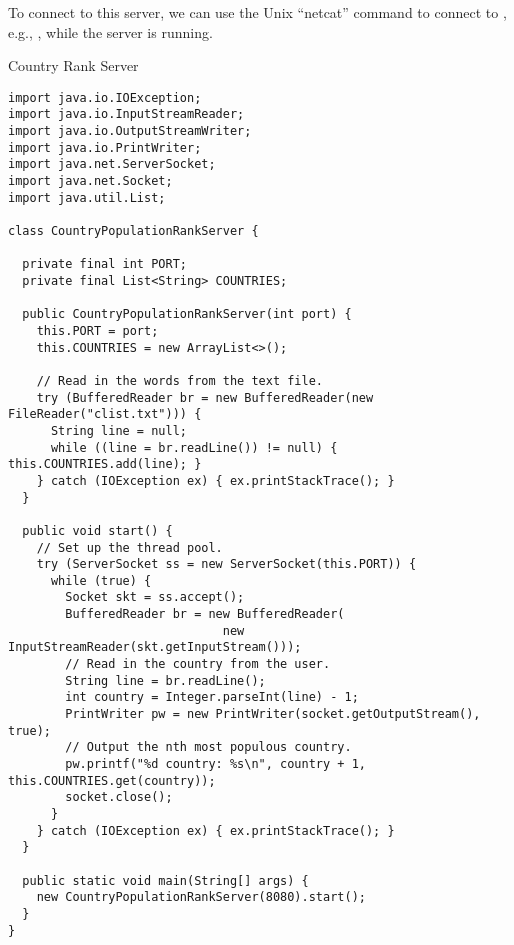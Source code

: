 To connect to this server, we can use the Unix  ``netcat'' command to connect to , e.g., , while the server is running.


\begin{cl}{Country Rank Server}
\begin{lstlisting}[language=MyJava]
import java.io.IOException;
import java.io.InputStreamReader;
import java.io.OutputStreamWriter;
import java.io.PrintWriter;
import java.net.ServerSocket;
import java.net.Socket;
import java.util.List;

class CountryPopulationRankServer {

  private final int PORT;
  private final List<String> COUNTRIES;

  public CountryPopulationRankServer(int port) {
    this.PORT = port;
    this.COUNTRIES = new ArrayList<>();

    // Read in the words from the text file.
    try (BufferedReader br = new BufferedReader(new FileReader("clist.txt"))) {
      String line = null;
      while ((line = br.readLine()) != null) { this.COUNTRIES.add(line); }
    } catch (IOException ex) { ex.printStackTrace(); }
  }

  public void start() {
    // Set up the thread pool.
    try (ServerSocket ss = new ServerSocket(this.PORT)) {
      while (true) {
        Socket skt = ss.accept();
        BufferedReader br = new BufferedReader(
                              new InputStreamReader(skt.getInputStream()));
        // Read in the country from the user.
        String line = br.readLine();
        int country = Integer.parseInt(line) - 1;
        PrintWriter pw = new PrintWriter(socket.getOutputStream(), true);
        // Output the nth most populous country.
        pw.printf("%d country: %s\n", country + 1, this.COUNTRIES.get(country));
        socket.close();
      }
    } catch (IOException ex) { ex.printStackTrace(); }
  }

  public static void main(String[] args) {
    new CountryPopulationRankServer(8080).start();
  }
}
\end{lstlisting}
\end{cl}

